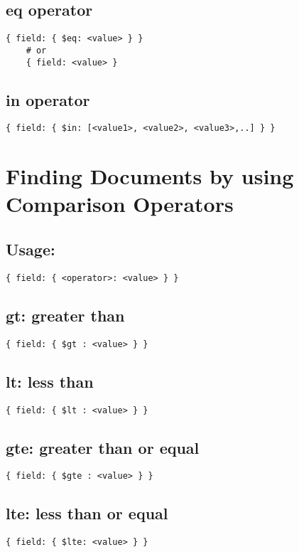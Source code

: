 \documentclass[../main.tex]{subfiles}
\begin{document}
\subsection{eq operator}
\begin{lstlisting}[language=MongoDB]
	{ field: { $eq: <value> } }
	# or
	{ field: <value> }
\end{lstlisting}

\subsection{in operator}
\begin{lstlisting}[language=MongoDB]
	{ field: { $in: [<value1>, <value2>, <value3>,..] } }
\end{lstlisting}

\section{Finding Documents by using Comparison Operators}
\subsection{Usage:}
\begin{lstlisting}[language=MongoDB,caption=Comparison Operators]
	{ field: { <operator>: <value> } }
\end{lstlisting}
\subsection{gt: greater than}
\begin{lstlisting}[language=MongoDB, caption=greater than gt]
	{ field: { $gt : <value> } }
\end{lstlisting}
\subsection{lt: less than}
\begin{lstlisting}[language=MongoDB, caption=less than lt]
	{ field: { $lt : <value> } }
\end{lstlisting}
\subsection{gte: greater than or equal}
\begin{lstlisting}[language=MongoDB, caption= greater than equal gte]
	{ field: { $gte : <value> } }
\end{lstlisting}
\subsection{lte: less than or equal}
\begin{lstlisting}[language=MongoDB, caption=less than equal lte]
	{ field: { $lte: <value> } }
\end{lstlisting}
\end{document}
